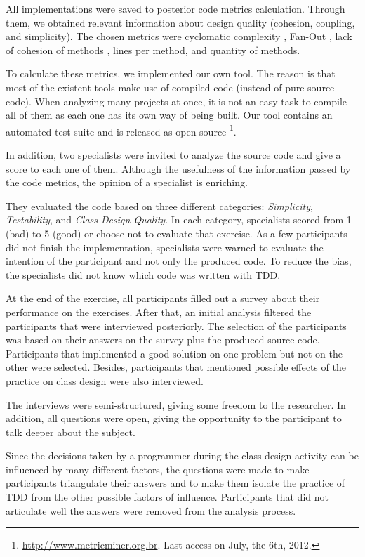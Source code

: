 \documentclass[times]{elsarticle}
\begin{document}
All implementations were saved to posterior code metrics calculation.
Through them, we obtained relevant information about design quality (cohesion, 
coupling, and simplicity). The chosen metrics were cyclomatic complexity \cite{mccabe},
Fan-Out \cite{lorenz}, lack of cohesion of methods \cite{lcom-hs}, lines per method,
and quantity of methods.

To calculate these metrics, we implemented our own tool. The reason is that
most of the existent tools make use of compiled code (instead of pure source
code). When analyzing many projects at once, it is not an easy task to compile all
of them as each one has its own way of being built.
Our tool contains an automated test suite and is released as open source
\footnote{\url{http://www.metricminer.org.br}. 
Last access on July, the 6th, 2012.}.

In addition, two specialists were invited to analyze the source code and give a score
to each one of them. Although the usefulness of the information passed by the code metrics,
the opinion of a specialist is enriching.

They evaluated the code based on three different categories: \textit{Simplicity}, \textit{Testability},
and \textit{Class Design Quality}. In each category, specialists scored from 1 (bad) to
5 (good) or choose not to evaluate that exercise. As a few participants did not finish the
implementation, specialists were warned to evaluate the intention of the participant and not
only the produced code.
To reduce the bias, the specialists did not know which code was written with TDD.

At the end of the exercise, all participants filled out a survey about their performance
on the exercises. After that, an initial analysis filtered the participants that
were interviewed posteriorly. The selection of the participants was based on
their answers on the survey plus the produced source code. Participants that implemented
a good solution on one problem but not on the other were selected. Besides, participants
that mentioned possible effects of the practice on class design were also interviewed.

The interviews were semi-structured, giving some freedom to the researcher. 
In addition, all questions were open, giving the
opportunity to the participant to talk deeper about the subject.

Since the decisions taken by a programmer during the class design activity can be
influenced by many different factors, the questions were made to make participants
triangulate their answers and to make them isolate the practice of TDD from
the other possible factors of influence. Participants that did not articulate well
the answers were removed from the analysis process.
\end{document}
